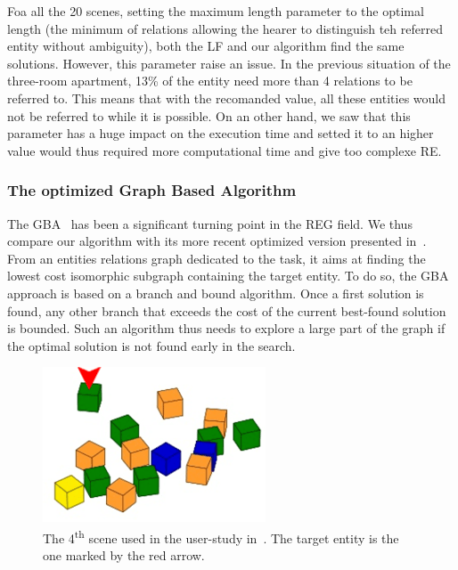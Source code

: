 Foa all the 20 scenes, setting the maximum length parameter to the optimal length (the minimum of relations allowing the hearer to distinguish teh referred entity without ambiguity), both the LF and our algorithm find the same solutions. However, this parameter raise an issue. In the previous situation of the three-room apartment, 13\% of the entity need more than 4 relations to be referred to. This means that with the recomanded value, all these entities would not be referred to while it is possible. On an other hand, we saw that this parameter has a huge impact on the execution time and setted it to an higher value would thus required more computational time and give too complexe RE.

\subsubsection{The optimized Graph Based Algorithm}

The GBA~\cite{viethen_2013_graphs} has been a significant turning point in the REG field. We thus compare our algorithm with its more recent optimized version presented in~\cite{li_2017_automatically}. From an entities relations graph dedicated to the task, it aims at finding the lowest cost isomorphic subgraph containing the target entity. To do so, the GBA approach is based on a branch and bound algorithm. Once a first solution is found, any other branch that exceeds the cost of the current best-found solution is bounded. Such an algorithm thus needs to explore a large part of the graph if the optimal solution is not found early in the search.

\begin{figure}[h!]
\centering
\includegraphics[scale=0.7]{figures/chapter4/GBA.png}
\caption{\label{fig:chap4_gba} The 4\textsuperscript{th} scene used in the user-study in~\cite{li_2016_spatial}. The target entity is the one marked by the red arrow.}
\end{figure}

